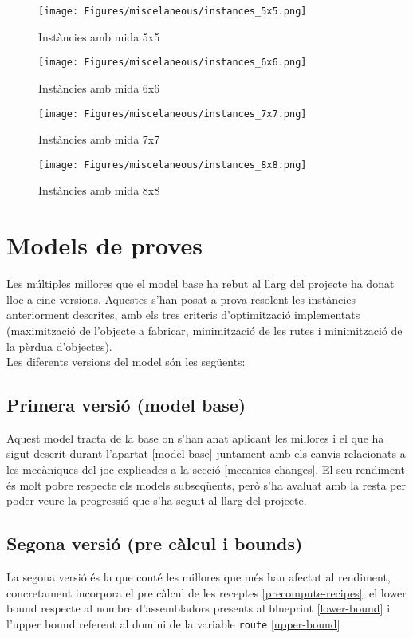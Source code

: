 \begin{figure}[H]
    \centering
    \texttt{[image: Figures/miscelaneous/instances\_5x5.png]}
    \caption{Instàncies amb mida 5x5}
\end{figure}
\begin{figure}[H]
    \centering
    \texttt{[image: Figures/miscelaneous/instances\_6x6.png]}
    \caption{Instàncies amb mida 6x6}
\end{figure}
\begin{figure}[H]
    \centering
    \texttt{[image: Figures/miscelaneous/instances\_7x7.png]}
    \caption{Instàncies amb mida 7x7}
\end{figure}
\begin{figure}[H]
    \centering
    \texttt{[image: Figures/miscelaneous/instances\_8x8.png]}
    \caption{Instàncies amb mida 8x8}
\end{figure}

\section{Models de proves}
Les múltiples millores que el model base ha rebut al llarg del projecte ha donat lloc a cinc versions. Aquestes s'han posat a prova resolent les instàncies anteriorment descrites, amb els tres criteris d'optimització implementats (maximització de l'objecte a fabricar, minimització de les rutes i minimització de la pèrdua d'objectes).\\
Les diferents versions del model són les següents:

\subsection{Primera versió (model base)}
Aquest model tracta de la base on s'han anat aplicant les millores i el que ha sigut descrit durant l'apartat \ref{model-base} juntament amb els canvis relacionats a les mecàniques del joc explicades a la secció \ref{mecanics-changes}. El seu rendiment és molt pobre respecte els models subseqüents, però s'ha avaluat amb la resta per poder veure la progressió que s'ha seguit al llarg del projecte.

\subsection{Segona versió (pre càlcul i bounds)}
La segona versió és la que conté les millores que més han afectat al rendiment, concretament incorpora el pre càlcul de les receptes \ref{precompute-recipes}, el lower bound respecte al nombre d'assembladors presents al blueprint \ref{lower-bound} i l'upper bound referent al domini de la variable \lstinline{route} \ref{upper-bound}

